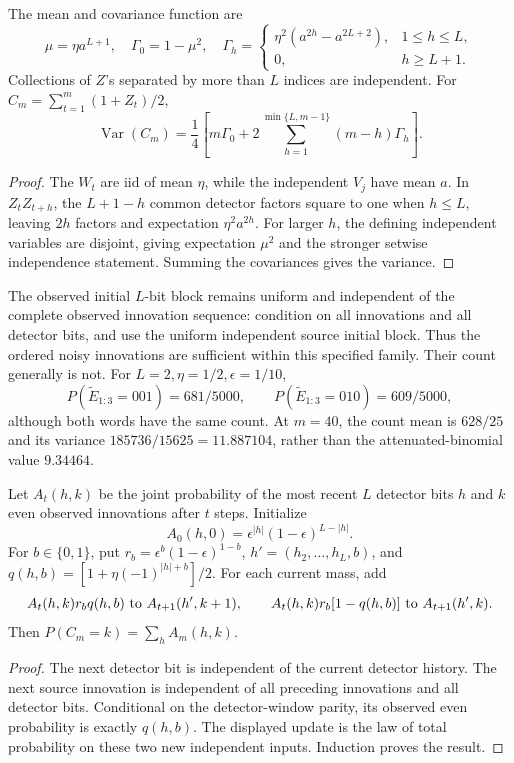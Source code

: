 \begin{proposition}\label{op:noisy-cov}
The mean and covariance function are
\[
 \mu=\eta a^{L+1},\quad \Gamma_0=1-\mu^2,\quad
 \Gamma_h=
 \begin{cases}
 \eta^2(a^{2h}-a^{2L+2}),&1\le h\le L,\\
 0,&h\ge L+1.
 \end{cases}
\]
Collections of \(Z\)'s separated by more than \(L\) indices are
independent.  For \(C_m=\sum_{t=1}^m(1+Z_t)/2\),
\[
 \operatorname{Var}(C_m)=\frac14
 \left[m\Gamma_0+
 2\sum_{h=1}^{\min\{L,m-1\}}(m-h)\Gamma_h\right].
\]
\end{proposition}
\begin{proof}
The \(W_t\) are iid of mean \(\eta\), while the independent \(V_j\) have
mean \(a\).  In \(Z_tZ_{t+h}\), the \(L+1-h\) common detector factors
square to one when \(h\le L\), leaving \(2h\) factors and expectation
\(\eta^2a^{2h}\).  For larger \(h\), the defining independent variables
are disjoint, giving expectation \(\mu^2\) and the stronger setwise
independence statement.  Summing the covariances gives the variance.
\end{proof}

The observed initial \(L\)-bit block remains uniform and independent of
the complete observed innovation sequence: condition on all innovations
and all detector bits, and use the uniform independent source initial
block.  Thus the ordered noisy innovations are sufficient within this
specified family.  Their count generally is not.  For
\(L=2,\eta=1/2,\epsilon=1/10\),
\[
 P(\widetilde E_{1:3}=001)=681/5000,\qquad
 P(\widetilde E_{1:3}=010)=609/5000,
\]
although both words have the same count.  At \(m=40\), the count mean is
\(628/25\) and its variance \(185736/15625=11.887104\), rather than the
attenuated-binomial value \(9.34464\).

\begin{proposition}\label{op:count-recursion}
Let \(A_t(h,k)\) be the joint probability of the most recent \(L\) detector
bits \(h\) and \(k\) even observed innovations after \(t\) steps.
Initialize
\[
 A_0(h,0)=\epsilon^{|h|}(1-\epsilon)^{L-|h|}.
\]
For \(b\in\{0,1\}\), put \(r_b=\epsilon^b(1-\epsilon)^{1-b}\),
\(h'=(h_2,\ldots,h_L,b)\), and
\(q(h,b)=[1+\eta(-1)^{|h|+b}]/2\).
For each current mass, add
\[
 A_t(h,k)r_bq(h,b)\ \hbox{to } A_{t+1}(h',k+1),\qquad
 A_t(h,k)r_b[1-q(h,b)]\ \hbox{to } A_{t+1}(h',k).
\]
Then \(P(C_m=k)=\sum_h A_m(h,k)\).
\end{proposition}
\begin{proof}
The next detector bit is independent of the current detector history.
The next source innovation is independent of all preceding innovations
and all detector bits.  Conditional on the detector-window parity, its
observed even probability is exactly \(q(h,b)\).
The displayed update is the law of total probability on these two
new independent inputs.  Induction proves the result.
\end{proof}

